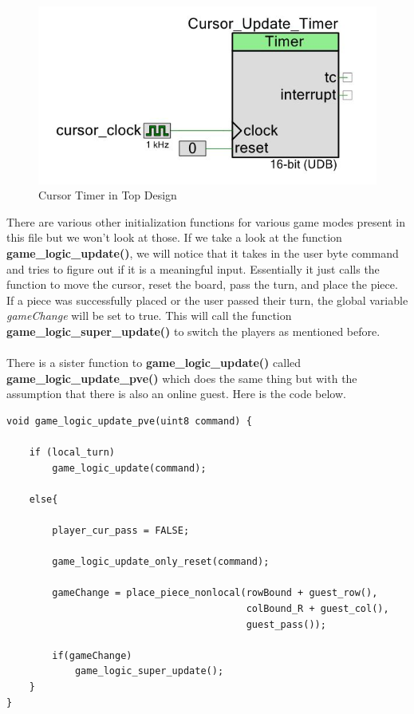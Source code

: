 \documentclass[a4paper, 12pt]{article}
\begin{document}
    \begin{figure}[H]
        \centering
        \includegraphics[scale=0.6]{pics/game_logic}
        \caption{Cursor Timer in Top Design}
        \label{fig:TopDesign}
    \end{figure}

    There are various other initialization functions for various game modes
    present in this file but we won't look at those. If we take a look at
    the function \textbf{game\_logic\_update()}, we will notice that it takes
    in the user byte command and tries to figure out if it is a meaningful
    input. Essentially it just calls the function to move the cursor, reset
    the board, pass the turn, and place the piece. If a piece was successfully
    placed or the user passed their turn, the global variable \textit{gameChange}
    will be set to true. This will call the function 
    \textbf{game\_logic\_super\_update()} to switch the players as mentioned
    before.
    \\ \\
    There is a sister function to \textbf{game\_logic\_update()} called
    \textbf{game\_logic\_update\_pve()} which does the same thing but with
    the assumption that there is also an online guest. Here is the code below.

    \begin{verbatim}
void game_logic_update_pve(uint8 command) {
    
    if (local_turn)
        game_logic_update(command);
    
    else{
        
        player_cur_pass = FALSE; 
        
        game_logic_update_only_reset(command);
        
        gameChange = place_piece_nonlocal(rowBound + guest_row(), 
                                          colBound_R + guest_col(), 
                                          guest_pass());
        
        if(gameChange)
            game_logic_super_update();
    }
}
    \end{verbatim}
\end{document}
